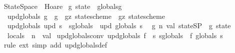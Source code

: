 %
\begin{isabellebody}%
%
%
\isamarkuptrue%
%
\isadelimtheory
%
\endisadelimtheory
%
\isatagtheory
{}\isamarkupfalse%
\ StateSpace\ \ Hoare\isanewline
{}%
\endisatagtheory
{\isafoldtheory}%
%
\isadelimtheory
%
\endisadelimtheory
\isanewline
\isanewline
{}\isamarkupfalse%
\ {\isacharprime}g\ state\ {\isacharequal}\ {\isachardoublequoteopen}globals{\isachardoublequoteclose}{\isacharcolon}{\isacharcolon}{\isacharprime}g\isanewline
\isanewline
{}\isamarkupfalse%
\isanewline
\ \ upd{\isacharunderscore}globals{\isacharcolon}{\isacharcolon}\ {\isachardoublequoteopen}{\isacharparenleft}{\isacharprime}g\ {\isasymRightarrow}\ {\isacharprime}g{\isacharparenright}\ {\isasymRightarrow}\ {\isacharparenleft}{\isacharprime}g{\isacharcomma}{\isacharprime}z{\isacharparenright}\ state{\isacharunderscore}scheme\ {\isasymRightarrow}\ {\isacharparenleft}{\isacharprime}g{\isacharcomma}{\isacharprime}z{\isacharparenright}\ state{\isacharunderscore}scheme{\isachardoublequoteclose}\isanewline
{}\isanewline
\ \ {\isachardoublequoteopen}upd{\isacharunderscore}globals\ upd\ s\ {\isacharequal}\ s{\isasymlparr}globals\ {\isacharcolon}{\isacharequal}\ upd\ {\isacharparenleft}globals\ s{\isacharparenright}{\isasymrparr}{\isachardoublequoteclose}\ \isanewline
\isanewline
{}\isamarkupfalse%
\ {\isacharparenleft}{\isacharprime}g{\isacharcomma}\ {\isacharprime}n{\isacharcomma}\ {\isacharprime}val{\isacharparenright}\ stateSP\ {\isacharequal}\ {\isachardoublequoteopen}{\isacharprime}g\ state{\isachardoublequoteclose}\ {\isacharplus}\isanewline
\ \ locals\ {\isacharcolon}{\isacharcolon}\ {\isachardoublequoteopen}{\isacharprime}n\ {\isasymRightarrow}\ {\isacharprime}val{\isachardoublequoteclose}\isanewline
\isanewline
{}\isamarkupfalse%
\ upd{\isacharunderscore}globals{\isacharunderscore}conv{\isacharcolon}\ {\isachardoublequoteopen}upd{\isacharunderscore}globals\ f\ {\isacharequal}\ {\isacharparenleft}{\isasymlambda}s{\isachardot}\ s{\isasymlparr}globals\ {\isacharcolon}{\isacharequal}\ f\ {\isacharparenleft}globals\ s{\isacharparenright}{\isasymrparr}{\isacharparenright}{\isachardoublequoteclose}\isanewline
%
\isadelimproof
\ \ %
\endisadelimproof
%
\isatagproof
{}\isamarkupfalse%
\ {\isacharparenleft}rule\ ext{\isacharparenright}\ {\isacharparenleft}simp\ add{\isacharcolon}\ upd{\isacharunderscore}globals{\isacharunderscore}def{\isacharparenright}%
\endisatagproof
{\isafoldproof}%
%
\isadelimproof
\isanewline
%
\endisadelimproof
%
\isadelimtheory
\isanewline
%
\endisadelimtheory
%
\isatagtheory
{}\isamarkupfalse%
%
\endisatagtheory
{\isafoldtheory}%
%
\isadelimtheory
%
\endisadelimtheory
%
\end{isabellebody}%

